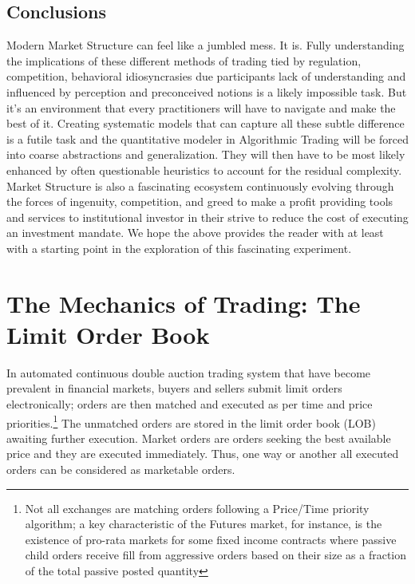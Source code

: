\subsection{Conclusions}
Modern Market Structure can feel like a jumbled mess. It is. Fully understanding the implications of these different methods of trading tied by regulation, competition, behavioral idiosyncrasies due participants lack of understanding and influenced by perception and preconceived notions  is a likely impossible task. But it's an environment that every practitioners will have to navigate and make the best of it. Creating systematic models that can capture all these subtle difference is a futile task and the quantitative modeler in Algorithmic Trading will be forced into coarse abstractions and generalization. They will then have to be most likely enhanced by often questionable heuristics to account for the residual complexity. Market Structure is also a fascinating ecosystem continuously evolving through the forces of ingenuity, competition, and greed to make a profit providing tools and services to institutional investor in their  strive to reduce the cost of executing an investment mandate. We hope the above provides the reader with at least with a starting point in the exploration of this fascinating  experiment.


\section{The Mechanics of Trading: The Limit Order Book}


In automated continuous double auction trading system that have become prevalent in financial markets, buyers and sellers submit limit orders electronically; orders are then matched and executed as per time and price priorities.\footnote{Not all exchanges are matching orders following a Price/Time priority algorithm; a key characteristic of the Futures market, for instance, is the existence of pro-rata markets for some fixed income contracts where passive child orders receive fill from aggressive orders based on their size as a fraction of the total passive posted quantity} The unmatched orders are stored in the limit order book (LOB) awaiting further execution. Market orders are orders seeking the best available price and they are executed immediately. Thus, one way or another all executed orders can be considered as marketable orders.


